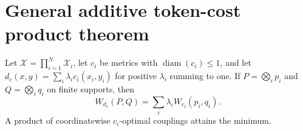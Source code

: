 \section*{General additive token-cost product theorem}
Let $\mathcal X=\prod_{i=1}^N\mathcal X_i$, let $c_i$ be metrics with
$\operatorname{diam}(c_i)\leq1$, and let $d_c(x,y)=\sum_i\lambda_i c_i(x_i,y_i)$
for positive $\lambda_i$ summing to one.  If $P=\bigotimes_i p_i$ and
$Q=\bigotimes_i q_i$ on finite supports, then
\[
W_{d_c}(P,Q)=\sum_i\lambda_i W_{c_i}(p_i,q_i).
\]
A product of coordinatewise $c_i$-optimal couplings attains the minimum.
